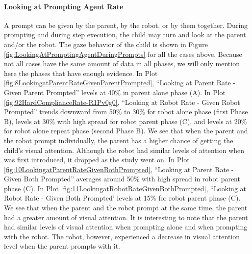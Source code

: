 \documentclass{ut-thesis}
\begin{document}
\paragraph{Looking at Prompting Agent Rate}
A prompt can be given by the parent, by the robot, or by them together.  During prompting and during step execution, the child may turn and look at the parent and/or the robot.  The gaze behavior of the child is shown in Figure \ref{fig:LookingAtPromptingAgentDuringPrompts} for all the cases above.  Because not all cases have the same amount of data in all phases, we will only mention here the phases that have enough evidence.  In Plot \ref{fig:8LookingatParentRateGivenParentPrompted}, ``Looking at Parent Rate - Given Parent Prompted'' levels at 40\% in parent alone phase (A).  In Plot \ref{fig:92HardComplianceRate-R1Pv0g0}, ``Looking at Robot Rate - Given Robot Prompted'' trends downward from 50\% to 30\% for robot alone phase (first Phase B), levels at 30\% with high spread for robot parent phase (C), and levels at 20\% for robot alone repeat phase (second Phase B).  We see that when the parent and the robot prompt individually, the parent has a higher chance of getting the child's visual attention.  Although the robot had similar levels of attention when was first introduced, it dropped as the study went on.  In Plot \ref{fig:10LookingatParentRateGivenBothPrompted}, ``Looking at Parent Rate - Given Both Prompted'' averages around 50\% with high spread in robot parent phase (C).  In Plot \ref{fig:11LookingatRobotRateGivenBothPrompted}, ``Looking at Robot Rate - Given Both Prompted' levels at 15\% for robot parent phase (C).  We see that when the parent and the robot prompt at the same time, the parent had a greater amount of visual attention.  It is interesting to note that the parent had similar levels of visual attention when prompting alone and when prompting with the robot.  The robot, however, experienced a decrease in visual attention level when the parent prompts with it.
\end{document}
